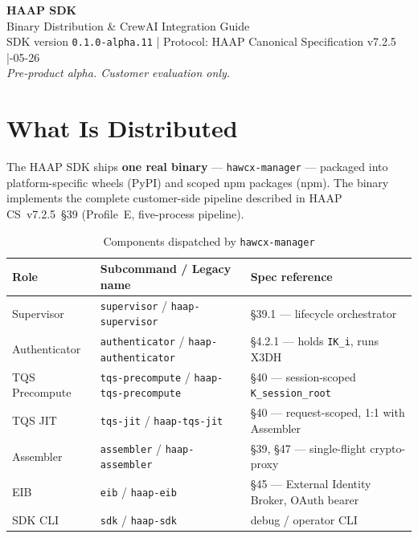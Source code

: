 \documentclass[11pt, a4paper]{article}
\newcommand{\pkg}[1]{\texttt{#1}}
\newcommand{\code}[1]{\texttt{#1}}
\begin{document}
\begin{center}
  {\LARGE\bfseries\color{hawcxblue} HAAP SDK}\\[6pt]
  {\large Binary Distribution \& CrewAI Integration Guide}\\[10pt]
  {\small SDK version \texttt{0.1.0-alpha.11} \quad|\quad
   Protocol: HAAP Canonical Specification v7.2.5 \quad|-05-26}\\[4pt]
  {\small\color{codered}\itshape Pre-product alpha. Customer evaluation only.}
\end{center}

\vspace{4pt}
\tableofcontents
\vspace{8pt}

\section{What Is Distributed}

The HAAP SDK ships \textbf{one real binary} --- \pkg{hawcx-manager} ---
packaged into platform-specific wheels (PyPI) and scoped npm packages (npm).
The binary implements the complete customer-side pipeline described in HAAP
CS~v7.2.5~§39 (Profile~E, five-process pipeline).

\begin{table}[h!]
\centering
\caption{Components dispatched by \texttt{hawcx-manager}}
\renewcommand{\arraystretch}{1.25}
\begin{tabularx}{\linewidth}{@{} l l X @{}}
\toprule
\textbf{Role} & \textbf{Subcommand / Legacy name} & \textbf{Spec reference} \\
\midrule
Supervisor          & \code{supervisor} / \code{haap-supervisor}           & §39.1 — lifecycle orchestrator \\
Authenticator       & \code{authenticator} / \code{haap-authenticator}     & §4.2.1 — holds \code{IK\_i}, runs X3DH \\
TQS Precompute      & \code{tqs-precompute} / \code{haap-tqs-precompute}   & §40 — session-scoped \code{K\_session\_root} \\
TQS JIT             & \code{tqs-jit} / \code{haap-tqs-jit}                 & §40 — request-scoped, 1:1 with Assembler \\
Assembler           & \code{assembler} / \code{haap-assembler}             & §39, §47 — single-flight crypto-proxy \\
EIB                 & \code{eib} / \code{haap-eib}                         & §45 — External Identity Broker, OAuth bearer \\
SDK CLI             & \code{sdk} / \code{haap-sdk}                         & debug / operator CLI \\
\bottomrule
\end{tabularx}
\end{table}
\end{document}

